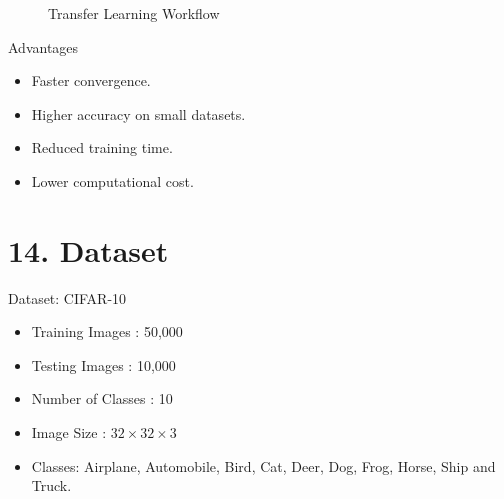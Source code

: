 \documentclass[11pt]{article}
\begin{document}
\begin{figure}[H]

\centering


\caption{Transfer Learning Workflow}

\end{figure}

Advantages

\begin{itemize}
\item Faster convergence.
\item Higher accuracy on small datasets.
\item Reduced training time.
\item Lower computational cost.
\end{itemize}


\section*{14. Dataset}

Dataset: CIFAR-10

\begin{itemize}

\item Training Images : 50,000

\item Testing Images : 10,000

\item Number of Classes : 10

\item Image Size : $32\times32\times3$

\item Classes:
Airplane, Automobile, Bird, Cat, Deer,
Dog, Frog, Horse, Ship and Truck.

\end{itemize}
\end{document}
